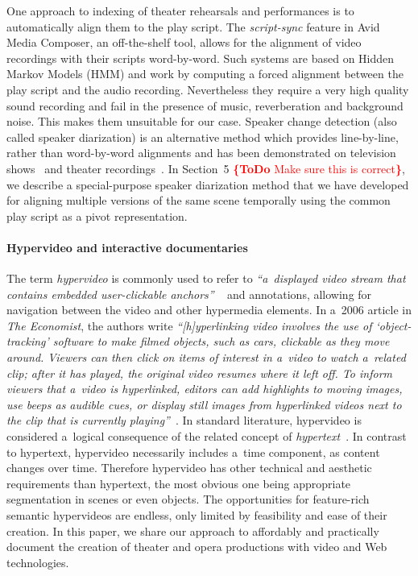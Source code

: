 \documentclass[conference]{IEEEtran}
\newcommand{\todo}[1]{\noindent\textcolor{red}{{\bf \{ToDo} #1{\bf \}}}}
\begin{document}
One approach to indexing of theater rehearsals and performances is to automatically align
them to the play script. The {\em script-sync} feature in Avid Media Composer,
an off-the-shelf tool, allows for the alignment of video recordings with their scripts word-by-word. Such systems
are based on Hidden Markov Models (HMM) and work by computing  a forced alignment 
between the play script and the audio recording. Nevertheless they require a very high quality 
sound recording and fail in the presence of music, reverberation and background noise. This makes them
unsuitable for our case. Speaker change detection (also called speaker diarization) is an alternative method
which provides line-by-line, rather than word-by-word alignments and has been demonstrated 
on television shows~\cite{Sankar09} and theater recordings~\cite{Caillet07,Caillet13}. In Section~5 \todo{Make sure this is correct},
we describe a special-purpose speaker diarization method that we have developed for aligning multiple versions 
of the same scene temporally using the common play script as a pivot representation.


\paragraph*{Hypervideo and interactive documentaries}

The term \emph{hypervideo} is commonly used to refer to
\textit{``a~displayed video stream that contains embedded user-clickable anchors''}%
~\cite{sawhney1996hypercafe,smith2002extensible}
and annotations, allowing for navigation between the video and other hypermedia elements.
In a~2006 article in \emph{The Economist}, the authors write 
\textit{``[h]yperlinking video involves the use of `object-tracking' software
to make filmed objects, such as cars, clickable as they move around.
Viewers can then click on items of interest in a~video
to watch a~related clip; after it has played,
the original video resumes where it left off.
To inform viewers that a~video is hyperlinked,
editors can add highlights to moving images, use beeps as audible cues,
or display still images from hyperlinked videos
next to the clip that is currently playing''}~\cite{economist2006hypervideo}.
In standard literature, hypervideo is considered a~logical consequence
of the related concept of \emph{hypertext}~\cite{bernerslee1990hypertext}.
In contrast to hypertext, hypervideo necessarily includes a~time component,
as content changes over time.
Therefore hypervideo has other technical and aesthetic requirements
than hypertext, the most obvious one being appropriate segmentation in scenes
or even objects.
The opportunities for feature-rich semantic hypervideos are endless,
only limited by feasibility and ease of their creation.
In this paper, we share our approach to affordably and practically document
the creation of theater and opera productions with video and Web technologies.
\end{document}
